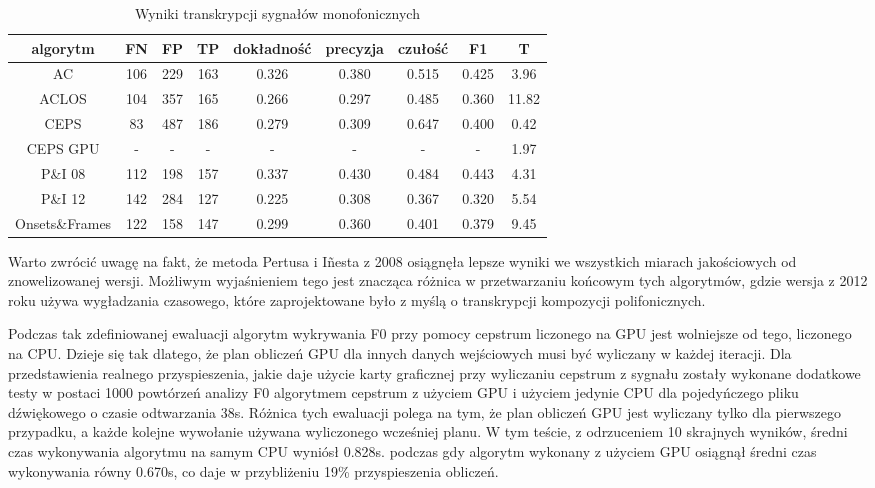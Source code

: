 \documentclass[12pt,a4paper,twoside]{mwart}
\begin{document}
\begin{table}[H]
  \begin{center}
    \begin{tabular}{ |c|c|c|c|c|c|c|c|c| } 
    \hline
    algorytm & FN & FP & TP & dokładność & precyzja & czułość & F1 & T\\
    \hline
    AC & 106 & 229 & 163 & 0.326 & 0.380 & 0.515 & 0.425 & 3.96 \\
    ACLOS & 104 & 357 & 165 & 0.266 & 0.297 & 0.485 & 0.360 & 11.82\\
    CEPS & 83 & 487 & 186 & 0.279 & 0.309 & 0.647 & 0.400 & 0.42\\
    CEPS GPU & - & - & - & - & - & - & - & 1.97\\
    P\&I 08  & 112 & 198 & 157 & 0.337 & 0.430 & 0.484 & 0.443 & 4.31\\
    P\&I 12 & 142 & 284 & 127 & 0.225 & 0.308 & 0.367 & 0.320 & 5.54\\
    Onsets\&Frames & 122 & 158 & 147 & 0.299 & 0.360 & 0.401 & 0.379 & 9.45\\
    \hline
    \end{tabular}
  \end{center}
  \caption{Wyniki transkrypcji sygnałów monofonicznych}
  \label{tab:eval:mono}
\end{table}

Warto zwrócić uwagę na fakt, że metoda Pertusa i Iñesta z 2008 osiągnęła lepsze wyniki we wszystkich miarach jakościowych od znowelizowanej wersji. Możliwym wyjaśnieniem tego jest znacząca różnica w przetwarzaniu końcowym tych algorytmów, gdzie wersja z 2012 roku używa wygładzania czasowego, które zaprojektowane było z myślą o transkrypcji kompozycji polifonicznych. 

Podczas tak zdefiniowanej ewaluacji algorytm wykrywania F0 przy pomocy cepstrum liczonego na GPU jest wolniejsze od tego, liczonego na CPU. Dzieje się tak dlatego, że plan obliczeń GPU dla innych danych wejściowych musi być wyliczany w każdej iteracji. Dla przedstawienia realnego przyspieszenia, jakie daje użycie karty graficznej przy wyliczaniu cepstrum z sygnału zostały wykonane dodatkowe testy w postaci 1000 powtórzeń analizy F0 algorytmem cepstrum z użyciem GPU i użyciem jedynie CPU dla pojedyńczego pliku dźwiękowego o czasie odtwarzania 38s. Różnica tych ewaluacji polega na tym, że plan obliczeń GPU jest wyliczany tylko dla pierwszego przypadku, a każde kolejne wywołanie używana wyliczonego wcześniej planu. W tym teście, z odrzuceniem 10 skrajnych wyników, średni czas wykonywania algorytmu na samym CPU wyniósł  0.828s. podczas gdy algorytm wykonany z użyciem GPU osiągnął średni czas wykonywania równy 0.670s, co daje w przybliżeniu 19\% przyspieszenia obliczeń.
\end{document}

